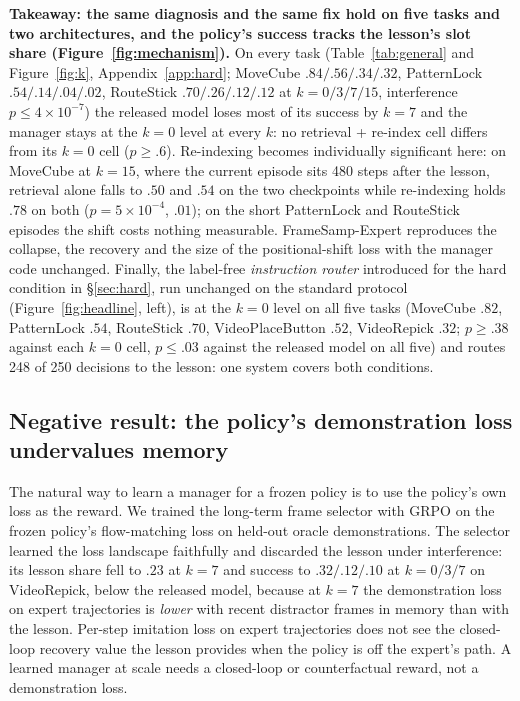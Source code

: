 \documentclass{article}
\begin{document}
\textbf{Takeaway: the same diagnosis and the same fix hold on five tasks and two architectures, and the policy's success tracks the lesson's slot share (Figure~\ref{fig:mechanism}).} On every task (Table~\ref{tab:general} and Figure~\ref{fig:k}, Appendix~\ref{app:hard}; MoveCube $.84/.56/.34/.32$, PatternLock $.54/.14/.04/.02$, RouteStick $.70/.26/.12/.12$ at $k=0/3/7/15$, interference $p\le4\times10^{-7}$) the released model loses most of its success by $k{=}7$ and the manager stays at the $k{=}0$ level at every $k$: no retrieval + re-index cell differs from its $k{=}0$ cell ($p\ge.6$). Re-indexing becomes individually significant here: on MoveCube at $k{=}15$, where the current episode sits 480 steps after the lesson, retrieval alone falls to $.50$ and $.54$ on the two checkpoints while re-indexing holds $.78$ on both ($p=5\times10^{-4}$, $.01$); on the short PatternLock and RouteStick episodes the shift costs nothing measurable. FrameSamp-Expert reproduces the collapse, the recovery and the size of the positional-shift loss with the manager code unchanged. Finally, the label-free \emph{instruction router} introduced for the hard condition in \S\ref{sec:hard}, run unchanged on the standard protocol (Figure~\ref{fig:headline}, left), is at the $k{=}0$ level on all five tasks (MoveCube $.82$, PatternLock $.54$, RouteStick $.70$, VideoPlaceButton $.52$, VideoRepick $.32$; $p\ge.38$ against each $k{=}0$ cell, $p\le.03$ against the released model on all five) and routes 248 of 250 decisions to the lesson: one system covers both conditions.

\subsection{Negative result: the policy's demonstration loss undervalues memory}
\label{sec:negative}

The natural way to learn a manager for a frozen policy is to use the policy's own loss as the reward. We trained the long-term frame selector with GRPO on the frozen policy's flow-matching loss on held-out oracle demonstrations. The selector learned the loss landscape faithfully and discarded the lesson under interference: its lesson share fell to $.23$ at $k{=}7$ and success to $.32/.12/.10$ at $k=0/3/7$ on VideoRepick, below the released model, because at $k{=}7$ the demonstration loss on expert trajectories is \emph{lower} with recent distractor frames in memory than with the lesson. Per-step imitation loss on expert trajectories does not see the closed-loop recovery value the lesson provides when the policy is off the expert's path. A learned manager at scale needs a closed-loop or counterfactual reward, not a demonstration loss.
\end{document}
